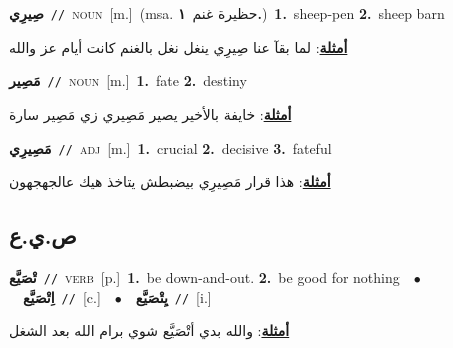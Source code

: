 \documentclass[10pt,a4paper,twoside]{article} %
\begin{document}
\begin{multicols}{2}
{\setlength\topsep{0pt}\textbf{\foreignlanguage{arabic}{صِيرِي}}\ {\color{gray}\texttt{//}\color{black}}\ \textsc{noun}\ [m.]\ \color{gray}(msa. \foreignlanguage{arabic}{حظيرة غنم}~\foreignlanguage{arabic}{\textbf{١.}})\color{black}\ \textbf{1.}~sheep-pen  \textbf{2.}~sheep barn\  \begin{flushright}\color{gray}\foreignlanguage{arabic}{\textbf{\underline{\foreignlanguage{arabic}{أمثلة}}}: لما بقآ عنا صِيرِي ينغل نغل بالغنم كانت أيام عز والله}\end{flushright}\color{black}} \vspace{2mm}

{\setlength\topsep{0pt}\textbf{\foreignlanguage{arabic}{مَصِير}}\ {\color{gray}\texttt{//}\color{black}}\ \textsc{noun}\ [m.]\ \textbf{1.}~fate  \textbf{2.}~destiny\  \begin{flushright}\color{gray}\foreignlanguage{arabic}{\textbf{\underline{\foreignlanguage{arabic}{أمثلة}}}: خايفة بالأخير يصير مَصِيري زي مَصِير سارة}\end{flushright}\color{black}} \vspace{2mm}

{\setlength\topsep{0pt}\textbf{\foreignlanguage{arabic}{مَصِيرِي}}\ {\color{gray}\texttt{//}\color{black}}\ \textsc{adj}\ [m.]\ \textbf{1.}~crucial  \textbf{2.}~decisive  \textbf{3.}~fateful\  \begin{flushright}\color{gray}\foreignlanguage{arabic}{\textbf{\underline{\foreignlanguage{arabic}{أمثلة}}}: هذا قرار مَصِيرِي بيضبطش يتاخذ هيك عالجهجهون}\end{flushright}\color{black}} \vspace{2mm}

\vspace{-3mm}
\subsection*{\color{blue}\foreignlanguage{arabic}{ص.ي.ع}\color{blue}{}} 

{\setlength\topsep{0pt}\textbf{\foreignlanguage{arabic}{تْصَيَّع}}\ {\color{gray}\texttt{//}\color{black}}\ \textsc{verb}\ [p.]\ \textbf{1.}~be down-and-out.  \textbf{2.}~be good for nothing\ \ $\bullet$\ \ \setlength\topsep{0pt}\textbf{\foreignlanguage{arabic}{اِتْصَيَّع}}\ {\color{gray}\texttt{//}\color{black}}\ [c.]\ \ $\bullet$\ \ \setlength\topsep{0pt}\textbf{\foreignlanguage{arabic}{يِتْصَيَّع}}\ {\color{gray}\texttt{//}\color{black}}\ [i.]\  \begin{flushright}\color{gray}\foreignlanguage{arabic}{\textbf{\underline{\foreignlanguage{arabic}{أمثلة}}}: والله بدي أتْصَيَّع شوي برام الله بعد الشغل}\end{flushright}\color{black}} \vspace{2mm}


\end{multicols}
\end{document}
